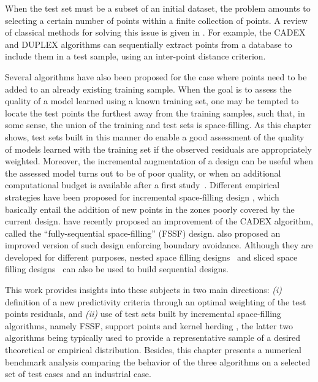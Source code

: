 When the test set must be a subset of an initial dataset, the problem amounts to selecting a certain number of points within a finite collection of points. 
A review of classical methods for solving this issue is given in \citet{borjir12}. 
For example, the CADEX and DUPLEX algorithms \citep{kensto69,sne77} can sequentially extract points from a database to include them in a test sample, using an inter-point distance criterion. 

Several algorithms have also been proposed for the case where points need to be added to an already existing training sample. 
When the goal is to assess the quality of a model learned using a known training set, one may be tempted to locate the test points the furthest away from the training samples, such that, in some sense, the union of the training and test sets is space-filling. 
As this chapter shows, test sets built in this manner do enable a good assessment of the quality of models learned with the training set if the observed residuals are appropriately weighted. 
Moreover, the incremental augmentation of a design can be useful when the assessed model turns out to be of poor quality, or when an additional computational budget is available after a first study~\citep{sheraz17,shang_apley_2020}. 
Different empirical strategies have been proposed for incremental space-filling design \citep{ioobou10,crolae11,lilu17}, which basically entail the addition of new points in the zones poorly covered by the current design. 
\citet{shang_apley_2020} have recently proposed an improvement of the CADEX algorithm, called the ``fully-sequential space-filling'' (FSSF) design. 
\citet{NogalesPR2021} also proposed an improved version of such design enforcing boundary avoidance. 
Although they are developed for different purposes, nested space filling designs~\citep{qiaai09} and sliced space filling designs~\citep{qiawu09} can also be used to build sequential designs. 

This work provides insights into these subjects in two main directions: \textit{(i)} definition of a new predictivity criteria through an optimal weighting of the test points residuals, and \textit{(ii)} use of test sets built by incremental space-filling algorithms, namely FSSF, support points \cite{mak_joseph_2018} and kernel herding \cite{chen_welling_2010}, the latter two algorithms being typically used to provide a representative sample of a desired theoretical or empirical distribution. 
Besides, this chapter presents a numerical benchmark analysis comparing the behavior of the three algorithms on a selected set of test cases and an industrial case.

